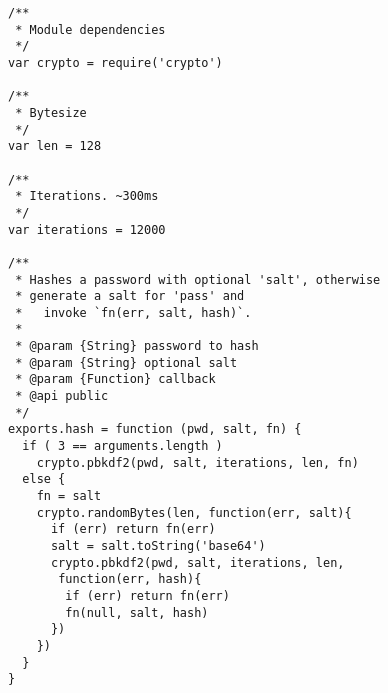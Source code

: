 
\lstset{language=C}

\begin{lstlisting}[frame=single]
/**
 * Module dependencies
 */
var crypto = require('crypto')

/**
 * Bytesize
 */
var len = 128

/**
 * Iterations. ~300ms
 */
var iterations = 12000

/**
 * Hashes a password with optional 'salt', otherwise
 * generate a salt for 'pass' and
 *   invoke `fn(err, salt, hash)`.
 *
 * @param {String} password to hash
 * @param {String} optional salt
 * @param {Function} callback
 * @api public
 */
exports.hash = function (pwd, salt, fn) {
  if ( 3 == arguments.length ) 
    crypto.pbkdf2(pwd, salt, iterations, len, fn)
  else {
    fn = salt
    crypto.randomBytes(len, function(err, salt){
      if (err) return fn(err)
      salt = salt.toString('base64')
      crypto.pbkdf2(pwd, salt, iterations, len, 
       function(err, hash){
        if (err) return fn(err)
        fn(null, salt, hash)
      })
    })
  }
}
\end{lstlisting}